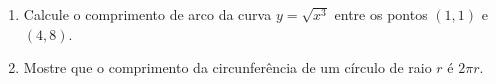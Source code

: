 \begin{frame}



\begin{exe}\begin{enumerate}
\item Calcule o comprimento de arco da curva $y =\sqrt{x^3} $ entre os pontos $(1, 1)$ e $(4, 8)$.

\item Mostre que o comprimento da circunferência de um círculo de raio $r$ é $2\pi r$. 



\end{enumerate}
\end{exe}
\end{frame}





